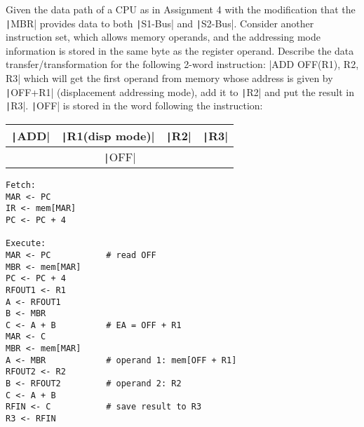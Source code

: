 \documentclass[answers]{exam}
\begin{document}
\begin{questions}
    \pagebreak
    \question Given the data path of a CPU as in Assignment 4 with the modification that the \texttt|MBR| provides data to both \texttt|S1-Bus| and \texttt|S2-Bus|. Consider another instruction set, which allows memory operands, and the addressing mode information is stored in the same byte as the register operand. Describe the data transfer/transformation for the following 2-word instruction:
    |ADD     OFF(R1), R2, R3|
    which will get the first operand from memory whose address is given by \texttt|OFF+R1| (displacement addressing mode), add it to \texttt|R2| and put the result in \texttt|R3|. \texttt|OFF| is stored in the word following the instruction:
    \begin{table}[htbp]
        \centering
        \begin{tabular}{|c|c|c|c|}
            \hline
            \texttt|ADD|
             & \texttt|R1(disp mode)|
             & \texttt|R2|
             & \texttt|R3|                     \\
            \hline\hline
            \multicolumn{4}{|c|}{\texttt|OFF|} \\ \hline
        \end{tabular}
    \end{table}

    \begin{solution}
        \begin{verbatim}
Fetch:
MAR <- PC
IR <- mem[MAR]
PC <- PC + 4

Execute:
MAR <- PC           # read OFF
MBR <- mem[MAR]
PC <- PC + 4
RFOUT1 <- R1
A <- RFOUT1
B <- MBR
C <- A + B          # EA = OFF + R1
MAR <- C
MBR <- mem[MAR]
A <- MBR            # operand 1: mem[OFF + R1]
RFOUT2 <- R2
B <- RFOUT2         # operand 2: R2
C <- A + B
RFIN <- C           # save result to R3
R3 <- RFIN
        \end{verbatim}
    \end{solution}

\end{questions}
\end{document}
